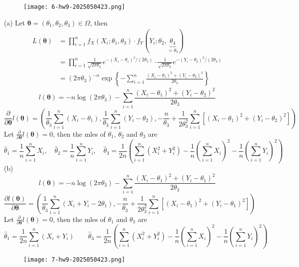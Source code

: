 \begin{exercise}
\begin{figure}[H]
\centering
\texttt{[image: 6-hw9-2025050423.png]}
\label{}
\end{figure}
\end{exercise}
(a)
Let $\boldsymbol{\theta}=(\theta_1,\theta_2,\theta_3)\in \Omega$, then
\[
\begin{aligned}
L(\boldsymbol{\theta}) & =\prod_{i=1}^{n} f_{X}(X_i;\theta_1,\theta_3)\cdot f_{Y}(Y_i;\theta_2,\underbrace{ \theta_4 }_{ =\theta_3 }) \\
 & =\prod_{i=1}^{n} \frac{1}{\sqrt{ 2\pi\theta_3 }}e^{ -(X_i-\theta_1)^2/(2\theta_3) }\cdot\frac{1}{\sqrt{ 2\pi\theta_3 }}e^{ -(Y_i-\theta_2)^2/(2\theta_3) } \\
 & =(2\pi\theta_3)^{-n}\exp \left\{ - \sum_{i=1}^{n} \frac{(X_i-\theta_1)^2+(Y_i-\theta_2)^2}{2\theta_3}  \right\}
\end{aligned}
\]
\[
l(\boldsymbol{\theta})=-n\log(2\pi\theta_3)-\sum_{i=1}^{n} \frac{(X_i-\theta_1)^2+(Y_i-\theta_2)^2}{2\theta_3}
\]
\[
\frac{ \partial   }{ \partial \boldsymbol{\theta} } l(\boldsymbol{\theta})=\left( \frac{1}{\theta_3}\sum_{i=1}^{n} (X_i-\theta_1),\frac{1}{\theta_3}\sum_{i=1}^{n}(Y_i-\theta_2),-\frac{n}{\theta_3}+\frac{1}{2\theta_3^2}\sum_{i=1}^{n} [(X_i-\theta_1)^2+(Y_i-\theta_2)^2]  \right)
\]
Let $\frac{ \partial  }{ \partial \boldsymbol{\theta} }l(\boldsymbol{\theta})=0$, then the mles of $\theta_1$, $\theta_2$ and $\theta_3$ are
\[
\widehat{\theta}_1=\frac{1}{n}\sum_{i=1}^{n} X_i,\quad \widehat{\theta}_2=\frac{1}{n}\sum_{i=1}^{n} Y_i,\quad \widehat{\theta}_3=\frac{1}{2n}\left( \sum_{i=1}^{n} (X_i^2+Y_i^2)-\frac{1}{n}\left( \sum_{i=1}^{n} X_i \right)^2-\frac{1}{n}\left( \sum_{i=1}^{n} Y_i \right)^2 \right)
\]
(b)
\[
l(\boldsymbol{\theta})=-n\log(2\pi\theta_3)-\sum_{i=1}^{n} \frac{(X_i-\theta_1)^2+(Y_i-\theta_1)^2}{2\theta_3}
\]
\[
\frac{ \partial l(\boldsymbol{\theta}) }{ \partial \boldsymbol{\theta} } =\left( \frac{1}{\theta_3}\sum_{i=1}^{n} (X_i+Y_i-2\theta_1),-\frac{n}{\theta_3}+\frac{1}{2\theta_3^2}\sum_{i=1}^{n} [(X_i-\theta_1)^2+(Y_i-\theta_1)^2] \right)
\]
Let $\frac{ \partial  }{ \partial \boldsymbol{\theta} }l(\boldsymbol{\theta})=0$, then the mles of $\theta_1$ and $\theta_3$ are
\[
\widehat{\theta}_{1}=\frac{1}{2n}\sum_{i=1}^{n} (X_i+Y_i)\qquad \widehat{\theta}_3=\frac{1}{2n}\left( \sum_{i=1}^{n} (X_i^2+Y_i^2)-\frac{1}{n}\left( \sum_{i=1}^{n} X_i \right)^2-\frac{1}{n}\left( \sum_{i=1}^{n} Y_i \right)^2 \right)
\]
\begin{exercise}
\begin{figure}[H]
\centering
\texttt{[image: 7-hw9-2025050423.png]}
\label{}
\end{figure}
\end{exercise}
